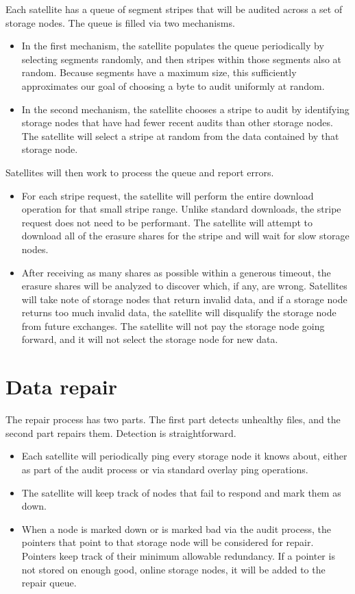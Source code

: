 \documentclass[11pt,fleqn,openany]{book}
\begin{document}
Each satellite has a queue of segment stripes that will be audited across
  a set of storage nodes. The queue is filled via two mechanisms.
  \begin{itemize}
  \item In the first mechanism, the satellite populates the queue periodically
    by selecting segments randomly, and then stripes within those segments also
    at random. Because segments have a maximum size, this sufficiently
    approximates our goal of choosing a byte to audit uniformly at random.
  \item In the second mechanism, the satellite chooses a stripe to audit by
    identifying storage nodes that have had fewer recent audits than other
    storage nodes. The satellite will select a stripe at random from the data
    contained by that storage node.
  \end{itemize}

Satellites will then work to process the queue and report errors.
\begin{itemize}
\item For each stripe request, the satellite will perform the entire download
  operation for that small stripe range. Unlike standard downloads, the stripe
  request does not need to be performant. The satellite will attempt to
  download all of the erasure shares for the stripe and will wait for slow
  storage nodes.
\item After receiving as many shares as possible within a generous timeout,
  the erasure shares will be analyzed to discover which, if any, are wrong.
  Satellites will take note of storage nodes that return invalid data, and if a
  storage node returns too much invalid data, the satellite will disqualify
  the storage node from future exchanges. The satellite will not pay the storage
  node going forward, and it will not select the storage node for new data.
\end{itemize}

\section{Data repair}

The repair process has two parts. The first part detects unhealthy files, and
the second part repairs them. Detection is straightforward.

\begin{itemize}
\item Each satellite will periodically ping every storage node it knows
about, either as part of the audit process or via standard overlay ping operations.
\item The satellite will keep track of nodes that fail to respond and mark
  them as down.
\item When a node is marked down or is marked bad via the audit process, the
  pointers that point to that storage node will be considered for repair.
  Pointers
  keep track of their minimum allowable redundancy. If a pointer is not stored
  on enough good, online storage nodes, it will be added to the repair queue.
\end{itemize}
\end{document}
